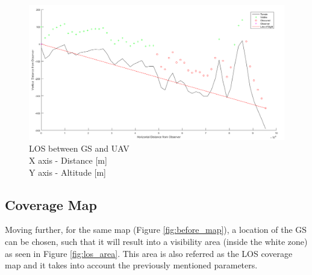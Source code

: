 \begin{figure}[h]
	\centering
	\includegraphics[scale=0.40]{figures/los_2points.png}
	\caption{LOS between GS and UAV \\ X axis - Distance [m] \\ Y axis - Altitude [m]}
   	\label{fig:los_2p}
\end{figure}

\subsection{Coverage Map}
Moving further, for the same map (Figure \ref{fig:before_map}), a location of the GS can be chosen, such that it will result into a visibility area (inside the white zone) as seen in Figure \ref{fig:los_area}. This area is also referred as the LOS coverage map and it takes into account the previously mentioned parameters.

